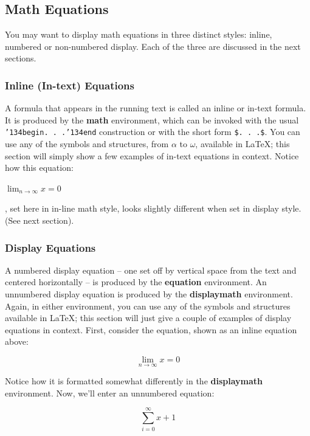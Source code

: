 \documentclass{sig-alternate-05-2015}
\begin{document}
\subsection{Math Equations}
You may want to display math equations in three distinct styles: inline, numbered or non-numbered display.  Each of the three are discussed in the next sections.

\subsubsection{Inline (In-text) Equations}
A formula that appears in the running text is called an inline or in-text formula. It is produced by the \textbf{math} environment, which can be invoked with the usual \texttt{{\char'134}begin. . .{\char'134}end} construction or with the short form \texttt{\$. . .\$}. You can use any of the symbols and structures, from $\alpha$ to $\omega$, available in \LaTeX\cite{Lamport:LaTeX}; this section will simply show a few examples of in-text equations in context. Notice how this equation:

\begin{math}
	\lim_{n\rightarrow \infty}x=0
\end{math}

, set here in in-line math style, looks slightly different when set in display style.  (See next section).

\subsubsection{Display Equations}
A numbered display equation -- one set off by vertical space from the text and centered horizontally -- is produced by the \textbf{equation} environment. An unnumbered display equation is produced by the \textbf{displaymath} environment. Again, in either environment, you can use any of the symbols and structures available in \LaTeX; this section will just give a couple of examples of display equations in context. First, consider the equation, shown as an inline equation above:

\begin{equation}
	\lim_{n\rightarrow \infty}x=0
\end{equation}

Notice how it is formatted somewhat differently in the \textbf{displaymath} environment.  Now, we'll enter an unnumbered equation:

\begin{displaymath}
	\sum_{i=0}^{\infty} x + 1
\end{displaymath}
\end{document}
